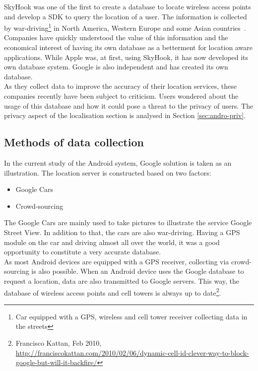 SkyHook was one of the first to create a database to locate wireless access points and develop a SDK to query the location of a user.
The information is collected by war-driving\footnote{Car equipped with a GPS, wireless and cell tower receiver collecting data in the streets} in North America, Western Europe and some Asian countries~\cite{skyhook-coverage}.\\

Companies have quickly understood the value of this information and the economical interest of having its own database as a betterment for location aware applications.
While Apple was, at first, using SkyHook, it has now developed its own database system.
Google is also independent and has created its own database.\\

As they collect data to improve the accuracy of their location services, these companies recently have been subject to criticism.
Users wondered about the usage of this database and how it could pose a threat to the privacy of users.
The privacy aspect of the localisation section is analysed in Section \ref{sec:andro-priv}.

\subsection{Methods of data collection}

In the current study of the Android system, Google solution is taken as an illustration.
The location server is constructed based on two factors:
\begin{itemize}
\item Google Cars
\item Crowd-sourcing
\end{itemize}

The Google Cars are mainly used to take pictures to illustrate the service Google Street View.
In addition to that, the cars are also war-driving.
Having a GPS module on the car and driving almost all over the world, it was a good opportunity to constitute a very accurate database.\\

As most Android devices are equipped with a GPS receiver, collecting via crowd-sourcing is also possible.
When an Android device uses the Google database to request a location, data are also transmitted to Google servers.
This way, the database of wireless access points and cell towers is always up to date\footnote{Francisco Kattan, Feb 2010, \url{http://franciscokattan.com/2010/02/06/dynamic-cell-id-clever-way-to-block-google-but-will-it-backfire/}}.


